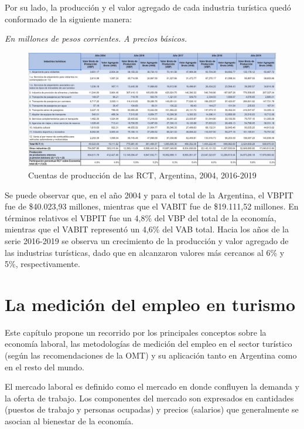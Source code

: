 \documentclass[
  openany]{book}
\begin{document}
Por su lado, la producción y el valor agregado de cada industria turística quedó conformado de la siguiente manera:

\emph{En millones de pesos corrientes. A precios básicos.}

\begin{figure}

{\centering \includegraphics[width=1\linewidth]{imagenes/figura1.4} 

}

\caption{Cuentas de producción de las RCT, Argentina, 2004, 2016-2019}\label{fig:cst}
\end{figure}

Se puede observar que, en el año 2004 y para el total de la Argentina, el VBPIT fue de \$40.023,93 millones, mientras que el VABIT fue de \$19.111,52 millones. En términos relativos el VBPIT fue un 4,8\% del VBP del total de la economía, mientras que el VABIT representó un 4,6\% del VAB total. Hacia los años de la serie 2016-2019 se observa un crecimiento de la producción y valor agregado de las industrias turísticas, dado que en alcanzaron valores más cercanos al 6\% y 5\%, respectivamente.

\hypertarget{medicion-empleo}{%
\chapter{\texorpdfstring{\textbf{La medición del empleo en turismo}}{La medición del empleo en turismo}}\label{medicion-empleo}}

Este capítulo propone un recorrido por los principales conceptos sobre la economía laboral, las metodologías de medición del empleo en el sector turístico (según las recomendaciones de la OMT) y su aplicación tanto en Argentina como en el resto del mundo.

El mercado laboral es definido como el mercado en donde confluyen la demanda y la oferta de trabajo. Los componentes del mercado son expresados en cantidades (puestos de trabajo y personas ocupadas) y precios (salarios) que generalmente se asocian al bienestar de la economía.
\end{document}
